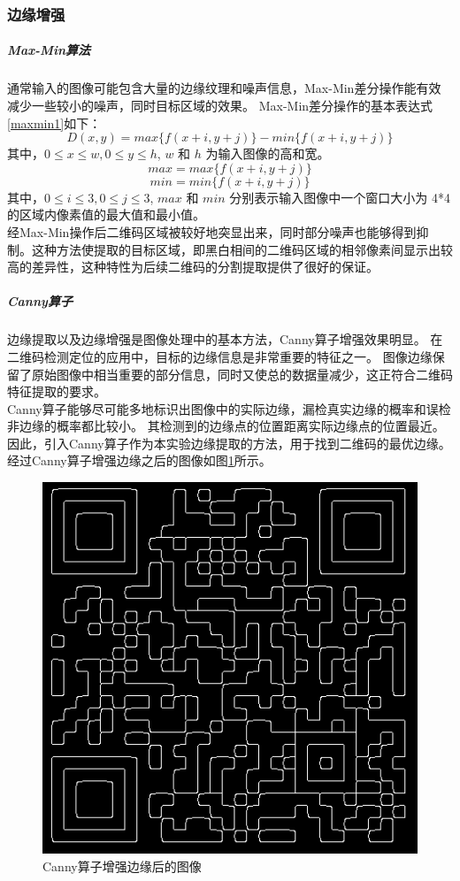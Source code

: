 \subsubsection{边缘增强}
\subparagraph{Max-Min算法}
通常输入的图像可能包含大量的边缘纹理和噪声信息，Max-Min差分操作\cite{13}能有效减少一些较小的噪声，同时目标区域的效果。
Max-Min差分操作的基本表达式\ref{maxmin1}如下：
\begin{equation}\label{maxmin1}
D(x,y) = max\{f(x+i, y+j)\} - min\{f(x+i, y+j)\}
\end{equation}
其中，$ 0 \le x \le w, 0 \le y \le h $, $ w $ 和 $ h $ 为输入图像的高和宽。\\
\begin{equation}\label{max}
max = max\{f(x+i,y+j)\}
\end{equation}
\begin{equation}\label{min}
min = min\{f(x+i,y+j)\}
\end{equation}
其中，$ 0 \le i \le 3, 0 \le j \le 3 $, $ max $ 和 $ min $ 分别表示输入图像中一个窗口大小为 4*4的区域内像素值的最大值和最小值。\\
经Max-Min操作后二维码区域被较好地突显出来，同时部分噪声也能够得到抑制。这种方法使提取的目标区域，即黑白相间的二维码区域的相邻像素间显示出较高的差异性，这种特性为后续二维码的分割提取提供了很好的保证。
\subparagraph{Canny算子}
边缘提取以及边缘增强是图像处理中的基本方法，Canny算子\cite{14}增强效果明显。
在二维码检测定位的应用中，目标的边缘信息是非常重要的特征之一。
图像边缘保留了原始图像中相当重要的部分信息，同时又使总的数据量减少，这正符合二维码特征提取的要求。\\
Canny算子能够尽可能多地标识出图像中的实际边缘，漏检真实边缘的概率和误检非边缘的概率都比较小。
其检测到的边缘点的位置距离实际边缘点的位置最近。
因此，引入Canny算子作为本实验边缘提取的方法，用于找到二维码的最优边缘。
经过Canny算子增强边缘之后的图像如图\ref{fig:canny}所示。
\begin{figure}[h]
\centering
\includegraphics[width=0.5\linewidth]{canny}
\caption[canny]{Canny算子增强边缘后的图像}
\label{fig:canny}
\end{figure}
